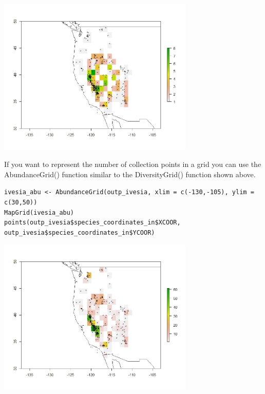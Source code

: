 \documentclass[a4paper,titlepage,11pt]{scrreprt}
\begin{document}
\begin{center}
\includegraphics[width=0.7\textwidth]{figures/diversity_grid_spgeoout.jpeg}\\
\end{center}

If you want to represent the number of collection points in a grid you can use the AbundanceGrid() function similar to the DiversityGrid() function shown above.

\texttt{ivesia\_abu \textless- AbundanceGrid(outp\_ivesia, xlim = c(-130,-105), ylim = c(30,50))}\\
\texttt{MapGrid(ivesia\_abu)}\\
\texttt{points(outp\_ivesia\$species\_coordinates\_in\$XCOOR, outp\_ivesia\$species\_coordinates\_in\$YCOOR)}\\

\begin{center}
\includegraphics[width=0.7\textwidth]{figures/abundance_grid.jpeg}\\
\end{center}
\end{document}
